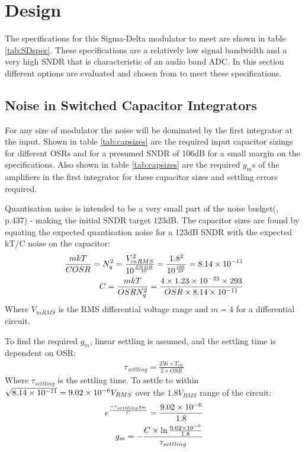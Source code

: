\section{Design}
\label{Design}
The specifications for this Sigma-Delta modulator to meet are shown in table \ref{tab:SDspec}.
These specifications are a relatively low signal bandwidth and a very high SNDR that is characteristic of an audio band ADC.
In this section different options are evaluated and chosen from to meet these specifications.



\subsection{Noise in  Switched Capacitor Integrators}
\label{Design:noise}
For any size of modulator the noise will be dominated by the first integrator at the input\cite{Henderson2013}.
Shown in table \ref{tab:capsizes} are the required input capacitor sizings for different OSRs and for a presumed SNDR of 106dB for a small margin on the specifications.
Also shown in table \ref{tab:capsizes} are the required $g_{m}$s of the amplifiers in the first integrator for these capacitor sizes and settling errors required.

Quantisation noise is intended to be a very small part of the noise budget(\cite{Steensgaard2004}, p.437) - making the initial SNDR target 123dB.
The capacitor sizes are found by equating the expected quantisation noise for a 123dB SNDR with the expected kT/C noise on the capacitor:
\begin{align}
    \frac{m k T}{C OSR} = N_{q}^{2} = \frac{V_{inRMS}^{2}}{10^{\frac{SNDR}{10}}} = \frac{1.8^{2}}{10^{\frac{106}{10}}} = 8.14\times 10^{-11} \\
    C = \frac{m k T}{OSR N_{q}^{2}} = \frac{4 \times 1.23\times 10^{-23} \times 293}{OSR \times 8.14\times 10^{-11}} 
\end{align}
Where $V_{inRMS}$ is the RMS differential voltage range and $m=4$ for a differential circuit.

To find the required $g_{m}$, linear settling is assumed, and the settling time is dependent on OSR:
\begin{align}
    \tau_{settling} = \frac{256\times T_{clk}}{2\times OSR}
\end{align}
Where $\tau_{settling}$ is the settling time.
To settle to within $\sqrt{8.14\times 10^{-11}} = 9.02\times 10^{-6} V_{RMS}$ over the $1.8 V_{RMS}$ range of the circuit:
\begin{align}
    e^{\frac{-\tau_{settling} g_{m}}{C}} = \frac{9.02\times 10^{-6}}{1.8} \\
    g_{m}  = - \frac{C \times \ln{\frac{9.02\ensuremath{\times 10^{-6}}}{1.8}}}{\tau_{settling}}
\end{align}

